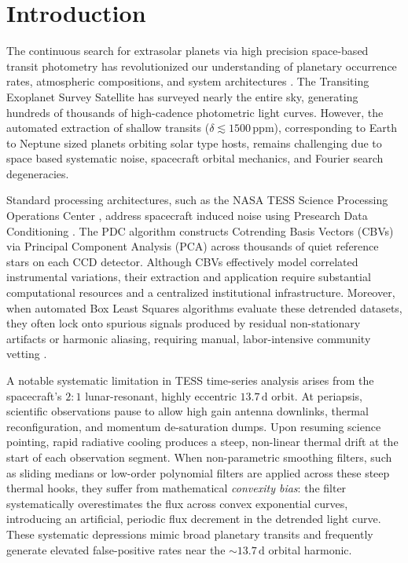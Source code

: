 \documentclass[twocolumn,linenumbers]{aastex701}
\begin{document}

\section{Introduction} \label{sec:intro}

The continuous search for extrasolar planets via high precision space-based transit photometry has revolutionized our understanding of planetary occurrence rates, atmospheric compositions, and system architectures \citep{borucki2010, ricker2015}. The Transiting Exoplanet Survey Satellite \citep[TESS;][]{ricker2015} has surveyed nearly the entire sky, generating hundreds of thousands of high-cadence photometric light curves. However, the automated extraction of shallow transits ($\delta \lesssim 1500\,\text{ppm}$), corresponding to Earth to Neptune sized planets orbiting solar type hosts, remains challenging due to space based systematic noise, spacecraft orbital mechanics, and Fourier search degeneracies.

Standard processing architectures, such as the NASA TESS Science Processing Operations Center \citep[SPOC;][]{jenkins2016}, address spacecraft induced noise using Presearch Data Conditioning \citep[PDC;][]{smith2012, stumpe2012}. The PDC algorithm constructs Cotrending Basis Vectors (CBVs) via Principal Component Analysis (PCA) across thousands of quiet reference stars on each CCD detector. Although CBVs effectively model correlated instrumental variations, their extraction and application require substantial computational resources and a centralized institutional infrastructure. Moreover, when automated Box Least Squares \citep[BLS;][]{kovacs2002} algorithms evaluate these detrended datasets, they often lock onto spurious signals produced by residual non-stationary artifacts or harmonic aliasing, requiring manual, labor-intensive community vetting \citep{guerrero2021}.

A notable systematic limitation in TESS time-series analysis arises from the spacecraft's $2:1$ lunar-resonant, highly eccentric $13.7\,\text{d}$ orbit. At periapsis, scientific observations pause to allow high gain antenna downlinks, thermal reconfiguration, and momentum de-saturation dumps. Upon resuming science pointing, rapid radiative cooling produces a steep, non-linear thermal drift at the start of each observation segment. When non-parametric smoothing filters, such as sliding medians or low-order polynomial filters are applied across these steep thermal hooks, they suffer from mathematical \textit{convexity bias}: the filter systematically overestimates the flux across convex exponential curves, introducing an artificial, periodic flux decrement in the detrended light curve. These systematic depressions mimic broad planetary transits and frequently generate elevated false-positive rates near the $\sim 13.7\,\text{d}$ orbital harmonic.
\end{document}
